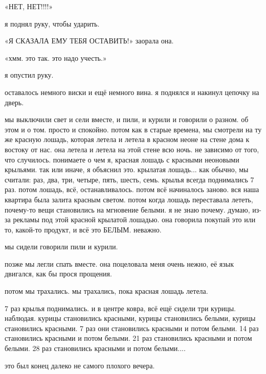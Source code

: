 «НЕТ, НЕТ!!!!»

я поднял руку, чтобы ударить.

«Я СКАЗАЛА ЕМУ ТЕБЯ ОСТАВИТЬ!» заорала она.

«хмм.
это так.
это надо учесть.»

я опустил руку.

оставалось немного виски и ещё немного вина.
я поднялся и накинул цепочку
на дверь.

мы выключили свет и сели вместе, и пили, и курили и говорили о разном.
об 
этом и о том.
просто и спокойно.
потом как в старые времена, мы смотрели на ту
же красную лошадь, которая летела и летела в красном неоне на стене дома к 
востоку от нас.
она летела и летела на этой стене всю ночь.
не зависимо от 
того, что случилось.
понимаете о чем я, красная лошадь с красными неоновыми
крыльями.
так или иначе, я объяснил это.
крылатая лошадь...
как обычно, мы 
считали: раз, два, три, четыре, пять, шесть, семь.
крылья всегда поднимались 
7 раз.
потом лошадь, всё, останавливалось.
потом всё начиналось заново.
вся 
наша квартира была залита красным светом.
потом когда лошадь переставала 
лететь, почему-то вещи становились на мгновение белыми.
я не знаю почему.
думаю, из-за рекламы под этой красной крылатой лошадью.
она говорила 
покупай это или то, какой-то продукт, и всё это БЕЛЫМ.
неважно.

мы сидели говорили пили и курили.

позже мы легли спать вместе.
она поцеловала меня очень нежно, её язык двигался, как бы прося прощения.

потом мы трахались.
мы трахались, пока красная лошадь летела.

7 раз крылья поднимались.
и в центре ковра, всё ещё сидели три курицы.
наблюдая.
курицы становились красными, курицы становились белыми, курицы 
становились красными.
7 раз они становились красными и потом белыми.
14 раз становились красными и потом белыми.
21 раз становились красными и потом белыми.
28 раз становились красными и потом белыми....

это был конец далеко не самого плохого вечера.
